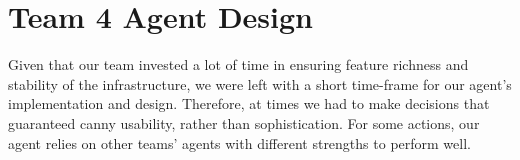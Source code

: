 



\chapter{Team 4 Agent Design}   \label{chap:team4}
Given that our team invested a lot of time in ensuring feature richness and stability of the infrastructure, we were left with a short time-frame for our agent's implementation and design. Therefore, at times we had to make decisions that guaranteed canny usability, rather than sophistication. For some actions, our agent relies on other teams' agents with different strengths to perform well. 

